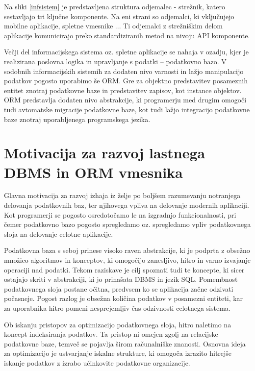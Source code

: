 \documentclass[a4paper,12pt,openright]{book}
\begin{document}
    \noindent
    Na sliki \ref{infsistem} je predstavljena struktura odjemalec - strežnik, katero sestavljajo tri ključne komponente. Na eni strani so odjemalci, ki vključujejo mobilne aplikacije, spletne vmesnike ... Ti odjemalci z strežniškim delom aplikacije komunicirajo preko standardiziranih metod na nivoju API komponente.

    Večji del informacijskega sistema oz. spletne aplikacije se nahaja v ozadju, kjer je realizirana poslovna logika in upravljanje s podatki – podatkovno bazo. V sodobnih informacijskih sistemih za dodaten nivo varnosti in lažjo manipulacijo podatkov pogosto uporabimo še ORM. Gre za objektno predstavitev posameznih entitet znotraj podatkovne baze in predstavitev zapisov, kot instance objektov. ORM predstavlja dodaten nivo abstrakcije, ki programerju med drugim omogoči tudi avtomatske migracije podatkovne baze, kot tudi lažjo integracijo podatkovne baze znotraj uporabljenega programskega jezika.

    \section{Motivacija za razvoj lastnega DBMS in ORM vmesnika}
    Glavna motivacija za razvoj izhaja iz želje po boljšem razumevanju notranjega delovanja podatkovnih baz, ter njihovega vpliva na delovanje modernih aplikaciji. Kot programerji se pogosto osredotočamo le na izgradnjo funkcionalnosti, pri čemer podatkovno bazo pogosto spregledamo oz. spregledamo vpliv podatkovnega sloja na delovanje celotne aplikacije.
    
    Podatkovna baza s seboj prinese visoko raven abstrakcije, ki je podprta z obsežno množico algoritmov in konceptov, ki omogočijo zanesljivo, hitro in varno izvajanje operaciji nad podatki. Tekom raziskave je cilj spoznati tudi te koncepte, ki sicer ostajajo skriti v abstrakciji, ki jo prinašata DBMS in jezik SQL.
    \newline
    \newline
    \noindent
    Pomembnost podatkovnega sloja postane očitna, predvsem ko se aplikacija začne odzivati počasneje. Pogost razlog je obsežna količina podatkov v posamezni entiteti, kar za uporabnika hitro pomeni nesprejemljiv čas odzivnosti celotnega sistema.

    Ob iskanju pristopov za optimizacijo podatkovnega sloja, hitro naletimo na koncept indeksiranja podatkov.
    Ta pristop ni omejen zgolj na relacijske podatkovne baze, temveč se pojavlja širom računalniške znanosti. Osnovna ideja za optimizacijo je ustvarjanje iskalne strukture, ki omogoča izrazito hitrejše iskanje podatkov z izrabo učinkovite podatkovne organizacije.
    
\end{document}
